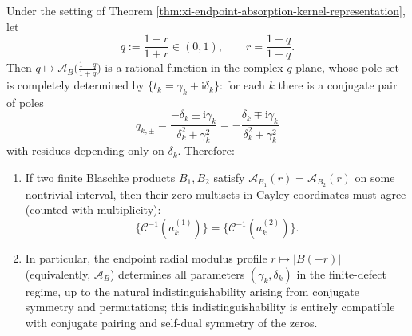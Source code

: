 \begin{theorem}\label{thm:xi-endpoint-absorption-inversion-uniqueness}
Under the setting of Theorem \ref{thm:xi-endpoint-absorption-kernel-representation}, let
\[
q:=\frac{1-r}{1+r}\in(0,1),
\qquad r=\frac{1-q}{1+q}.
\]
Then \(q\mapsto \mathcal{A}_B\!\bigl(\frac{1-q}{1+q}\bigr)\) is a rational function in the complex \(q\)-plane, whose pole set is completely determined by \(\{t_k=\gamma_k+\mathrm{i}\delta_k\}\): for each \(k\) there is a conjugate pair of poles
\begin{equation}\label{eq:xi-endpoint-absorption-q-poles}
\boxed{\;
q_{k,\pm}=\frac{-\delta_k\pm \mathrm{i}\gamma_k}{\delta_k^2+\gamma_k^2}
=-\frac{\delta_k\mp \mathrm{i}\gamma_k}{\delta_k^2+\gamma_k^2}\;}
\end{equation}
with residues depending only on \(\delta_k\).
Therefore:
\begin{enumerate}
  \item If two finite Blaschke products \(B_1,B_2\) satisfy \(\mathcal{A}_{B_1}(r)=\mathcal{A}_{B_2}(r)\) on some nontrivial interval, then their zero multisets in Cayley coordinates must agree (counted with multiplicity):
  \[
  \{\mathcal{C}^{-1}(a_k^{(1)})\}=\{\mathcal{C}^{-1}(a_k^{(2)})\}.
  \]
  \item In particular, the endpoint radial modulus profile \(r\mapsto |B(-r)|\) (equivalently, \(\mathcal{A}_B\)) determines all parameters \((\gamma_k,\delta_k)\) in the finite-defect regime, up to the natural indistinguishability arising from conjugate symmetry and permutations; this indistinguishability is entirely compatible with conjugate pairing and self-dual symmetry of the zeros.
\end{enumerate}
\end{theorem}

